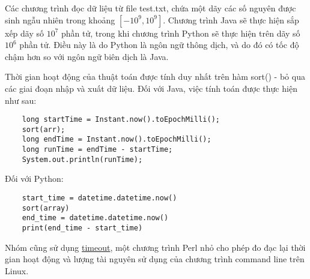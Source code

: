 \documentclass{article}
\begin{document}
    Các chương trình đọc dữ liệu từ file test.txt, chứa một dãy các số
    nguyên được sinh ngẫu nhiên trong khoảng $[-10^9, 10^9]$. Chương 
    trình Java sẽ thực hiện sắp xếp dãy số $10^7$ phần tử, trong khi 
    chương trình Python sẽ thực hiện trên dãy số $10^6$ phần tử. Điều
    này là do Python là ngôn ngữ thông dịch, và do đó có tốc độ chậm hơn so
    với ngôn ngữ biên dịch là Java.

    Thời gian hoạt động của thuật toán được tính duy nhất trên hàm sort() -
    bỏ qua các giai đoạn nhập và xuất dữ liệu. Đối với Java, việc tính toán
    được thực hiện như sau:

    \begin{lstlisting}
    long startTime = Instant.now().toEpochMilli();
    sort(arr);
    long endTime = Instant.now().toEpochMilli();
    long runTime = endTime - startTime;
    System.out.println(runTime);    
    \end{lstlisting}

    Đối với Python:

    \begin{lstlisting}
    start_time = datetime.datetime.now()
    sort(array)
    end_time = datetime.datetime.now()
    print(end_time - start_time)
    \end{lstlisting}

    Nhóm cũng sử dụng \href{https://github.com/pshved/timeout}{timeout},
    một chương trình Perl nhỏ cho phép đo đạc lại thời gian hoạt động và 
    lượng tài nguyên sử dụng của chương trình command line trên Linux.
\end{document}
